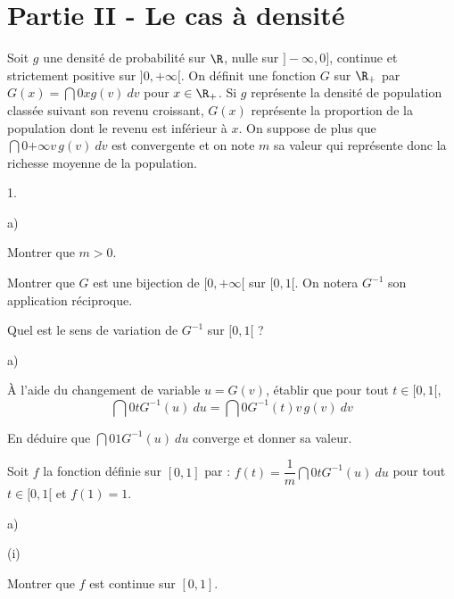 \documentclass[11pt]{article}%
\begin{document}
\section*{Partie II - Le cas à densité}

\noindent
Soit $g$ une densité de probabilité sur $\R$, nulle sur $]-\infty, 0]$, 
continue et strictement positive sur $]0,+\infty[$. On définit une 
fonction $G$ sur $\R_+$ par $G(x)=\dint{0}{x} g(v) \ dv$ pour $x \in 
\R_+$. Si $g$ représente la densité de population classée suivant son 
revenu croissant, $G(x)$ représente la proportion de la population dont 
le revenu est inférieur à $x$. On suppose de plus que 
$\dint{0}{+\infty} v \, g(v) \ dv$ est convergente et on note $m$ sa 
valeur qui représente donc la richesse moyenne de la population. 

\begin{noliste}{1.}
 \setlength{\itemsep}{4mm}
 \setcounter{enumi}{5}
 \item 
 \begin{noliste}{a)}
  \setlength{\itemsep}{2mm}
  \item Montrer que $m >0$.
  
  

  
  \item Montrer que $G$ est une bijection de $[0,+\infty[$ sur $[0,1[$. 
  On notera $G^{-1}$ son application réciproque.
  
  

  
  \item Quel est le sens de variation de $G^{-1}$ sur $[0,1[$ ?
  
  
 \end{noliste}
 
 \item
 \begin{noliste}{a)}
  \setlength{\itemsep}{2mm}
  \item À l'aide du changement de variable $u=G(v)$, établir que pour 
  tout $t \in [0,1[$, 
  \[
   \dint{0}{t} G^{-1}(u) \ du= \dint{0}{G^{-1}(t)} v \, g(v) \ dv
  \]
  
  
  
  \item En déduire que $\dint{0}{1} G^{-1}(u) \ du$ converge et donner 
  sa valeur. 
  
  

 \end{noliste}
 
 \item Soit $f$ la fonction définie sur $[0,1]$ par : $f(t)= 
 \dfrac{1}{m} \dint{0}{t} G^{-1}(u) \ du$ pour tout $t \in [0,1[$ et 
 $f(1)=1$.
 \begin{noliste}{a)}
  \setlength{\itemsep}{2mm}
  \item 
  \begin{nonoliste}{(i)}
   \item Montrer que $f$ est continue sur $[0,1]$. 
   

\end{nonoliste}
\end{noliste}
\end{noliste}
\end{document}
